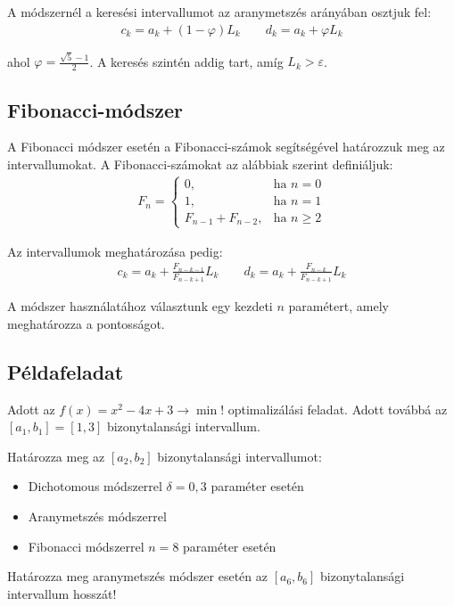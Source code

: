 \documentclass[a4paper,12pt,svgnames]{report}
\begin{document}
\begin{multicols}{2}
\firstline A módszernél a keresési intervallumot az aranymetszés arányában osztjuk fel:
\begin{gather*}
c_k=a_k+(1-\varphi)L_k \qquad
d_k=a_k+\varphi L_k
\end{gather*}

ahol $\varphi=\tfrac{\sqrt{5}-1}{2}$. A keresés szintén addig tart, amíg $L_k>\varepsilon$.

\subsection{Fibonacci-módszer}

\firstline A Fibonacci módszer esetén a Fibonacci-számok segítségével határozzuk meg az intervallumokat. A Fibonacci-számokat az alábbiak szerint definiáljuk:
\begin{gather*}
F_n=\begin{cases}
    0,&\mbox{ha } n=0\\[-0.3em]
    1,&\mbox{ha } n=1\\[-0.3em]
    F_{n-1}+F_{n-2},&\mbox{ha } n\geq2
\end{cases}
\end{gather*}

Az intervallumok meghatározása pedig:
\begin{gather*}
c_k=a_k+\frac{F_{n-k-1}}{F_{n-k+1}}L_k \qquad
d_k=a_k+\frac{F_{n-k}}{F_{n-k+1}}L_k 
\end{gather*}

A módszer használatához választunk egy kezdeti $n$ paramétert, amely meghatározza a pontosságot.

\subsection{Példafeladat}

\feladatszam Adott az $f(x)=x^2-4x+3\longrightarrow\min!$ optimalizálási feladat. Adott továbbá az $[a_1,b_1]=[1,3]$ bizonytalansági intervallum.
\begin{alphanumericlist}
\item Határozza meg az $[a_2,b_2]$ bizonytalansági intervallumot:
  \begin{itemize}
    \item Dichotomous módszerrel $\delta =0,3$ paraméter esetén
    \item Aranymetszés módszerrel
    \item Fibonacci módszerrel $n=8$ paraméter esetén
  \end{itemize}
\item Határozza meg aranymetszés módszer esetén az $[a_6,b_6]$ bizonytalansági intervallum hosszát!
\end{alphanumericlist}


\end{multicols}
\end{document}
